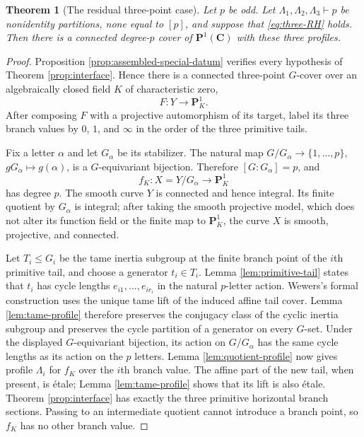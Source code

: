 \documentclass[10pt,a4paper]{amsart}
\newtheorem{theorem}{Theorem}[section]
\numberwithin{equation}{section}
\begin{document}
\begin{theorem}[The residual three-point case]\label{thm:residual}
Let $p$ be odd.  Let $\Lambda_1,\Lambda_2,\Lambda_3\vdash p$ be nonidentity
partitions, none equal to $[p]$, and suppose that
\eqref{eq:three-RH} holds.  Then there is a connected degree-$p$ cover of
$\mathbf P^1(\mathbf C)$ with these three profiles.
\end{theorem}

\begin{proof}
Proposition \ref{prop:assembled-special-datum} verifies every hypothesis of
Theorem \ref{prop:interface}.  Hence there is a connected three-point
$G$-cover over an algebraically closed field $K$ of characteristic zero,
\[
 F:Y\longrightarrow\mathbf P^1_K.
\]
After composing $F$ with a projective automorphism of its target, label its
three branch values by $0$, $1$, and $\infty$ in the order of the three
primitive tails.

Fix a letter $\alpha$ and let $G_\alpha$ be its stabilizer.  The natural map
$G/G_\alpha\to\{1,\ldots,p\}$, $gG_\alpha\mapsto g(\alpha)$, is a
$G$-equivariant bijection.  Therefore $[G:G_\alpha]=p$, and
\[
 f_K:X=Y/G_\alpha\longrightarrow\mathbf P^1_K
\]
has degree $p$.  The smooth curve $Y$ is connected and hence integral.  Its
finite quotient by $G_\alpha$ is integral; after taking the smooth projective
model, which does not alter its function field or the finite map to
$\mathbf P^1_K$, the curve $X$ is smooth, projective, and connected.

Let $T_i\leq G_i$ be the tame inertia subgroup at the finite branch point
of the $i$th primitive tail, and choose a generator $t_i\in T_i$.  Lemma
\ref{lem:primitive-tail} states that $t_i$ has cycle lengths
$e_{i1},\ldots,e_{ir_i}$ in the natural $p$-letter action.  Wewers's formal
construction uses the unique tame lift of the induced affine tail cover.
Lemma \ref{lem:tame-profile} therefore preserves the conjugacy class of the
cyclic inertia subgroup and preserves the cycle partition of a generator
on every $G$-set.  Under the displayed $G$-equivariant bijection, its action
on $G/G_\alpha$ has the same cycle lengths as its action on the $p$ letters.
Lemma \ref{lem:quotient-profile} now gives profile $\Lambda_i$ for $f_K$
over the $i$th branch value.  The affine part of the new tail, when present,
is \'etale; Lemma \ref{lem:tame-profile} shows that its lift is also \'etale.
Theorem \ref{prop:interface} has exactly the three primitive horizontal
branch sections.  Passing to an intermediate quotient cannot introduce a
branch point, so $f_K$ has no other branch value.


\end{proof}
\end{document}
